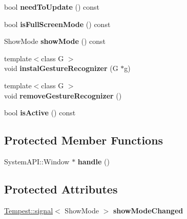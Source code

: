 \begin{DoxyCompactItemize}
\item 
\hypertarget{class_tempest_1_1_window_a9821d6989b5aed15aba9e8849070ea8d}{bool {\bfseries need\+To\+Update} () const }\label{class_tempest_1_1_window_a9821d6989b5aed15aba9e8849070ea8d}

\item 
\hypertarget{class_tempest_1_1_window_afc13aedcaed3394ecced49d0fc518cce}{bool {\bfseries is\+Full\+Screen\+Mode} () const }\label{class_tempest_1_1_window_afc13aedcaed3394ecced49d0fc518cce}

\item 
\hypertarget{class_tempest_1_1_window_aed69ab67995faf8f0406f29c2d9cde36}{Show\+Mode {\bfseries show\+Mode} () const }\label{class_tempest_1_1_window_aed69ab67995faf8f0406f29c2d9cde36}

\item 
\hypertarget{class_tempest_1_1_window_a1e6a112f40362a80eca1c4200ce14f6d}{{\footnotesize template$<$class G $>$ }\\void {\bfseries instal\+Gesture\+Recognizer} (G $\ast$g)}\label{class_tempest_1_1_window_a1e6a112f40362a80eca1c4200ce14f6d}

\item 
\hypertarget{class_tempest_1_1_window_a7f90868c08f53519327525edd582ecf2}{{\footnotesize template$<$class G $>$ }\\void {\bfseries remove\+Gesture\+Recognizer} ()}\label{class_tempest_1_1_window_a7f90868c08f53519327525edd582ecf2}

\item 
\hypertarget{class_tempest_1_1_window_ac65039dd7a01080ca3ee6d8354033002}{bool {\bfseries is\+Active} () const }\label{class_tempest_1_1_window_ac65039dd7a01080ca3ee6d8354033002}

\end{DoxyCompactItemize}
\subsection*{Protected Member Functions}
\begin{DoxyCompactItemize}
\item 
\hypertarget{class_tempest_1_1_window_a6769a61e64a4f312332e0deded0f4f26}{System\+A\+P\+I\+::\+Window $\ast$ {\bfseries handle} ()}\label{class_tempest_1_1_window_a6769a61e64a4f312332e0deded0f4f26}

\end{DoxyCompactItemize}
\subsection*{Protected Attributes}
\begin{DoxyCompactItemize}
\item 
\hypertarget{class_tempest_1_1_window_abfa4c2ebad4b4f6bcca001ff16c0a8a7}{\hyperlink{class_tempest_1_1signal}{Tempest\+::signal}$<$ Show\+Mode $>$ {\bfseries show\+Mode\+Changed}}\label{class_tempest_1_1_window_abfa4c2ebad4b4f6bcca001ff16c0a8a7}

\end{DoxyCompactItemize}
